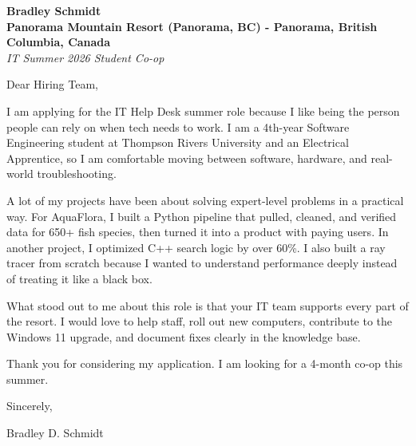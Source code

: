 \documentclass[11pt]{article}
\begin{document}
\textbf{Bradley Schmidt}\\
\vspace{0.5em}
\textbf{Panorama Mountain Resort (Panorama, BC) - Panorama, British Columbia, Canada}\\
\textit{IT Summer 2026 Student Co-op}

Dear Hiring Team,

\par

I am applying for the IT Help Desk summer role because I like being the person people can rely on when tech needs to work. I am a 4th-year Software Engineering student at Thompson Rivers University and an Electrical Apprentice, so I am comfortable moving between software, hardware, and real-world troubleshooting.

\par

A lot of my projects have been about solving expert-level problems in a practical way. For AquaFlora, I built a Python pipeline that pulled, cleaned, and verified data for 650+ fish species, then turned it into a product with paying users. In another project, I optimized C++ search logic by over 60\%. I also built a ray tracer from scratch because I wanted to understand performance deeply instead of treating it like a black box.

\par

What stood out to me about this role is that your IT team supports every part of the resort. I would love to help staff, roll out new computers, contribute to the Windows 11 upgrade, and document fixes clearly in the knowledge base.

\par

Thank you for considering my application. I am looking for a 4-month co-op this summer.

\par

Sincerely,

\par

Bradley D. Schmidt
\end{document}
